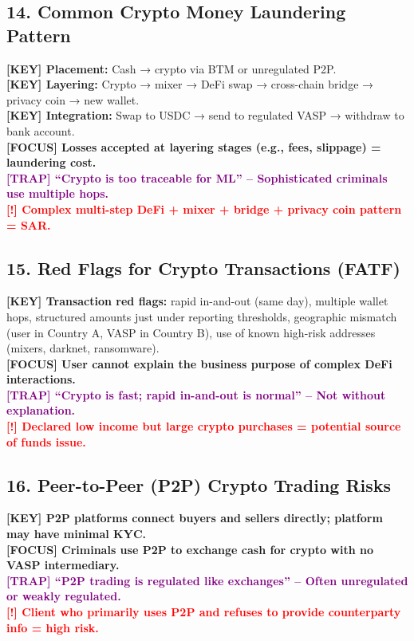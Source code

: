 \documentclass[10pt,a4paper]{article}
\newcommand{\redflag}[1]{\textcolor{red}{\textbf{[!] #1}}}
\newcommand{\examfocus}[1]{\textcolor{orange!80!black}{\textbf{[FOCUS] #1}}}
\newcommand{\trap}[1]{\textcolor{purple}{\textbf{[TRAP] #1}}}
\newcommand{\keyterm}[1]{\textcolor{red!80!black}{\textbf{[KEY] #1}}}
\begin{document}
\subsection*{14. Common Crypto Money Laundering Pattern}
\keyterm{Placement:} Cash → crypto via BTM or unregulated P2P. \\
\keyterm{Layering:} Crypto → mixer → DeFi swap → cross-chain bridge → privacy coin → new wallet. \\
\keyterm{Integration:} Swap to USDC → send to regulated VASP → withdraw to bank account. \\
\examfocus{Losses accepted at layering stages (e.g., fees, slippage) = laundering cost.} \\
\trap{“Crypto is too traceable for ML” – Sophisticated criminals use multiple hops.} \\
\redflag{Complex multi-step DeFi + mixer + bridge + privacy coin pattern = SAR.}

\subsection*{15. Red Flags for Crypto Transactions (FATF)}
\keyterm{Transaction red flags:} rapid in-and-out (same day), multiple wallet hops, structured amounts just under reporting thresholds, geographic mismatch (user in Country A, VASP in Country B), use of known high-risk addresses (mixers, darknet, ransomware). \\
\examfocus{User cannot explain the business purpose of complex DeFi interactions.} \\
\trap{“Crypto is fast; rapid in-and-out is normal” – Not without explanation.} \\
\redflag{Declared low income but large crypto purchases = potential source of funds issue.}

\subsection*{16. Peer-to-Peer (P2P) Crypto Trading Risks}
\keyterm{P2P platforms connect buyers and sellers directly; platform may have minimal KYC.} \\
\examfocus{Criminals use P2P to exchange cash for crypto with no VASP intermediary.} \\
\trap{“P2P trading is regulated like exchanges” – Often unregulated or weakly regulated.} \\
\redflag{Client who primarily uses P2P and refuses to provide counterparty info = high risk.}
\end{document}
